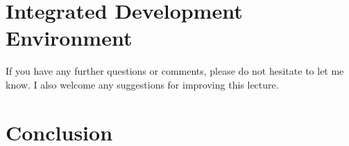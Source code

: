 \section{Integrated Development Environment}
If you have any further questions or comments, please do not hesitate to let me know. I also welcome any suggestions for improving this lecture.

\section{Conclusion}




